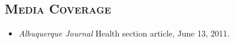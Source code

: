 \documentclass[centered,overlapped,line]{res}
\begin{document}
\begin{resume}

  \section{\bf \large \scshape  Media Coverage}
  \begin{itemize}[]
  \item \textit{Albuquerque Journal} Health section article, June 13, 2011.
  \end{itemize}


  \pagestyle{fancy}

\end{resume}
\end{document}
